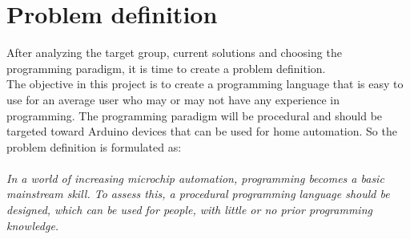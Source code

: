 \section{Problem definition}
After analyzing the target group, current solutions and choosing the programming paradigm, it is time to create a problem definition. \\ The objective in this project is to create a programming language that is easy to use for an average user who may or may not have any experience in programming. The programming paradigm will be procedural and should be targeted toward Arduino devices that can be used for home automation. So the problem definition is formulated as:\\
\\


\textit{In a world of increasing microchip automation, programming becomes a basic mainstream skill. To assess this, a procedural programming language should be designed, which can be used for people, with little or no prior programming knowledge.}